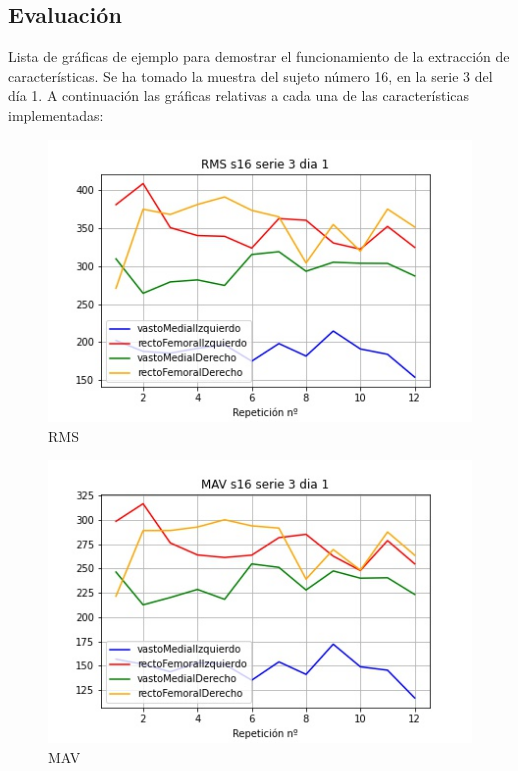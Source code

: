     \subsection{Evaluación \label{anexo caracteristicas}}

Lista de gráficas de ejemplo para demostrar el funcionamiento de la extracción de características.
Se ha tomado la muestra del sujeto número 16, en la serie 3 del día 1. A continuación las gráficas relativas a cada una de las características implementadas:

\begin{figure}[ht]
	\centering
  \includegraphics[width=1.0\textwidth]{imagenes/caracteristicas/RMS s16 serie 3 dia 1.jpg}
  \caption{ RMS}
  \label{fig:rms}
\end{figure}

\begin{figure}[ht]
	\centering
  \includegraphics[width=1.0\textwidth]{imagenes/caracteristicas/MAV s16 serie 3 dia 1.jpg}
  \caption{MAV}
  \label{fig:mav}
\end{figure}

